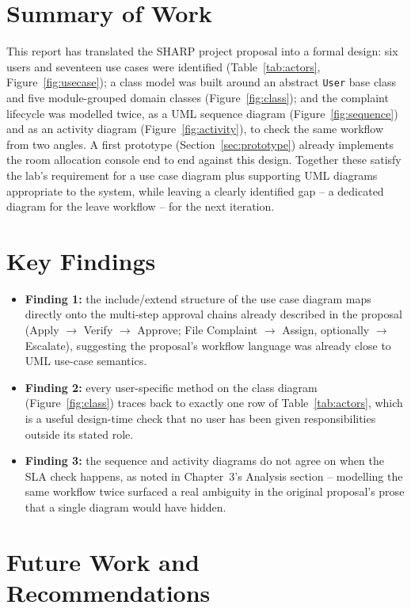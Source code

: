 \documentclass{tietreport}
\begin{document}
\section{Summary of Work}

This report has translated the SHARP project proposal into a formal
design: six users and seventeen use cases were identified
(Table~\ref{tab:actors}, Figure~\ref{fig:usecase}); a class model was
built around an abstract \texttt{User} base class and five module-grouped
domain classes (Figure~\ref{fig:class}); and the complaint lifecycle was
modelled twice, as a UML sequence diagram (Figure~\ref{fig:sequence})
and as an activity diagram (Figure~\ref{fig:activity}), to check the
same workflow from two angles. A first prototype
(Section~\ref{sec:prototype}) already implements the room allocation
console end to end against this design. Together these satisfy the
lab's requirement for a use case diagram plus supporting UML diagrams
appropriate to the system, while leaving a clearly identified gap -- a
dedicated diagram for the leave workflow -- for the next iteration.

\section{Key Findings}

\begin{itemize}
  \item \textbf{Finding 1:} the include/extend structure of the use case
    diagram maps directly onto the multi-step approval chains already
    described in the proposal (Apply $\to$ Verify $\to$ Approve; File
    Complaint $\to$ Assign, optionally $\to$ Escalate), suggesting the
    proposal's workflow language was already close to UML use-case
    semantics.
  \item \textbf{Finding 2:} every user-specific method on the class
    diagram (Figure~\ref{fig:class}) traces back to exactly one row of
    Table~\ref{tab:actors}, which is a useful design-time check that no
    user has been given responsibilities outside its stated role.
  \item \textbf{Finding 3:} the sequence and activity diagrams do not
    agree on when the SLA check happens, as noted in Chapter~3's
    Analysis section -- modelling the same workflow twice surfaced a
    real ambiguity in the original proposal's prose that a single
    diagram would have hidden.
\end{itemize}

\section{Future Work and Recommendations}
\end{document}
